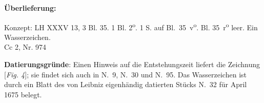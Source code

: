 \begin{ledgroupsized}[r]{120mm}
\footnotesize 
\pstart 
\noindent\textbf{\"{U}berlieferung:}
\pend
\end{ledgroupsized}
\begin{ledgroupsized}[r]{114mm}
\footnotesize 
\pstart \parindent -6mm
Konzept: LH XXXV 13, 3 Bl. 35. 1 Bl. 2\textsuperscript{o}. 1 S. auf Bl.~35~v\textsuperscript{o}. Bl. 35~r\textsuperscript{o} leer. Ein Wasserzeichen. \\Cc 2, Nr. 974 \pend
\end{ledgroupsized}
 
\vspace*{5mm}
\begin{ledgroup}
\footnotesize 
\pstart
\noindent\footnotesize{\textbf{Datierungsgr\"{u}nde}: Einen Hinweis auf die Entstehungszeit liefert die Zeichnung [\textit{Fig. 4}]; sie findet sich auch in N.~9, N.~30 und N.~95.
Das Wasserzeichen ist durch ein Blatt des von Leibniz eigenhändig datierten Stücks N.~32
für April 1675 belegt.}
\pend
\end{ledgroup}

